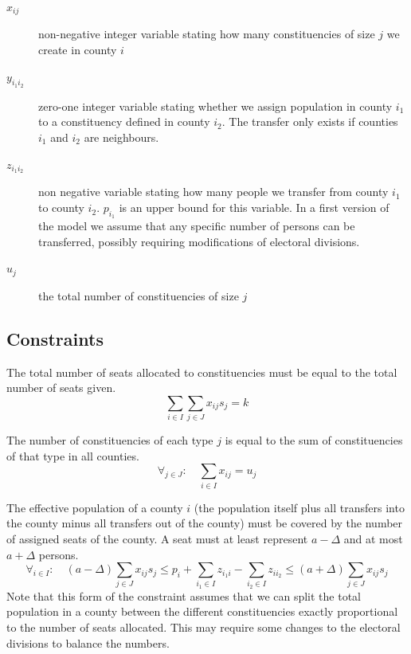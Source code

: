 \documentclass[runningheads]{llncs}
\begin{document}
\begin{description}
\item[$x_{ij}$] non-negative integer variable stating how many constituencies of size $j$ we create in county $i$
\item[$y_{i_1i_2}$] zero-one integer variable stating whether we assign population in county $i_{1}$ to a constituency defined in county $i_{2}$. The transfer only exists if counties $i_{1}$ and $i_{2}$ are neighbours.
\item[$z_{i_1i_2}$] non negative variable stating how many people we transfer from county $i_{1}$ to county $i_{2}$. $p_{i_1}$ is an upper bound for this variable. In a first version of the model we assume that any specific number of persons can be transferred, possibly requiring modifications of electoral divisions. 
\item[$u_{j}$] the total number of constituencies of size $j$
\end{description}

\subsection{Constraints}

The total number of seats allocated to constituencies must be equal to the total number of seats given.
\begin{equation}
\sum_{i \in I} \sum_{j \in J} x_{ij}s_{j} = k
\end{equation}

The number of constituencies of each type $j$ is equal to the sum of constituencies of that type in all counties.
\begin{equation}
\forall_{j \in J}:\quad \sum_{i \in I} x_{ij} = u_{j}
\end{equation}

The effective population of a county $i$ (the population itself plus all transfers into the county minus all transfers out of the county) must be covered by the number of assigned seats of the county. A seat must at least represent $a-\Delta$ and at most $a+\Delta$ persons.
\begin{equation}
\forall_{i \in I}:\quad (a-\Delta)\sum_{j \in J} x_{ij}s_{j} \leq p_{i}+\sum_{i_1 \in I} z_{i_1i} - \sum_{i_2 \in I} z_{ii_2}\leq (a+\Delta)\sum_{j \in J} x_{ij}s_{j}
\end{equation}
Note that this form of the constraint assumes that we can split the total population in a county between the different constituencies exactly proportional to the number of seats allocated. This may require some changes to the electoral divisions to balance the numbers.
\end{document}
